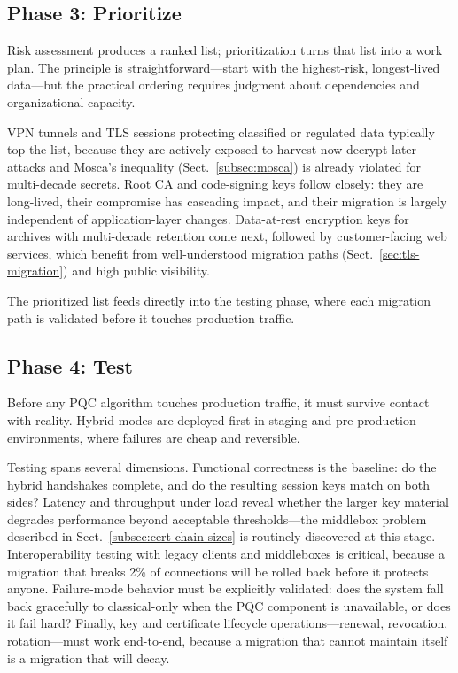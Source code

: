 \subsection{Phase 3: Prioritize}
\label{subsec:phase-prioritize}

Risk assessment produces a ranked list; prioritization turns that list into a work plan.  The principle is straightforward---start with the highest-risk, longest-lived data---but the practical ordering requires judgment about dependencies and organizational capacity.

VPN tunnels and TLS sessions protecting classified or regulated data typically top the list, because they are actively exposed to harvest-now-decrypt-later attacks and Mosca's inequality (Sect.~\ref{subsec:mosca}) is already violated for multi-decade secrets.  Root CA and code-signing keys follow closely: they are long-lived, their compromise has cascading impact, and their migration is largely independent of application-layer changes.  Data-at-rest encryption keys for archives with multi-decade retention come next, followed by customer-facing web services, which benefit from well-understood migration paths (Sect.~\ref{sec:tls-migration}) and high public visibility.

The prioritized list feeds directly into the testing phase, where each migration path is validated before it touches production traffic.

\subsection{Phase 4: Test}
\label{subsec:phase-test}

Before any PQC algorithm touches production traffic, it must survive contact with reality.  Hybrid modes are deployed first in staging and pre-production environments, where failures are cheap and reversible.

Testing spans several dimensions.  Functional correctness is the baseline: do the hybrid handshakes complete, and do the resulting session keys match on both sides?  Latency and throughput under load reveal whether the larger key material degrades performance beyond acceptable thresholds---the middlebox problem described in Sect.~\ref{subsec:cert-chain-sizes} is routinely discovered at this stage.  Interoperability testing with legacy clients and middleboxes is critical, because a migration that breaks 2\% of connections will be rolled back before it protects anyone.  Failure-mode behavior must be explicitly validated: does the system fall back gracefully to classical-only when the PQC component is unavailable, or does it fail hard?  Finally, key and certificate lifecycle operations---renewal, revocation, rotation---must work end-to-end, because a migration that cannot maintain itself is a migration that will decay.

